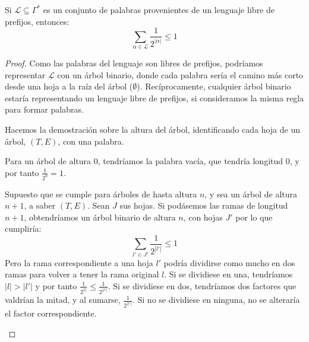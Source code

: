 \begin{lemma}
 Si $\mathcal{L}\subseteq \Gamma^{\ast}$ es un conjunto de palabras provenientes de un lenguaje libre de prefijos, entonces:
 \[
   \sum_{\alpha \in \mathcal{L}} \frac{1}{2^{|\alpha|}} \le 1
 \]
 \label{lemma:kraft}
\end{lemma}
  \begin{proof}
   Como las palabras del lenguaje son libres de prefijos, podríamos representar $\mathcal{L}$ con un árbol binario, donde
   cada palabra sería el camino más corto desde una hoja a la raíz del árbol ($\emptyset$). Recíprocamente, cualquier árbol binario estaría
   representando un lenguaje libre de prefijos, si consideramos la misma regla para formar palabras.
   
   Hacemos la demostración sobre la altura del árbol, identificando cada hoja de un árbol, $(T,E)$, con una palabra.
   
   \begin{subenv}
    Para un árbol de altura $0$, tendríamos la palabra vacía, que tendría longitud $0$, y por tanto $\frac{1}{2^0} = 1$.
    
    Supuesto que se cumple para árboles de hasta altura $n$, y sea un árbol de altura $n+1$, a saber $(T,E)$. Sean $J$ sus hojas.
    Si podásemos las ramas de longitud $n+1$, obtendríamos un árbol binario de altura $n$, con hojas $J'$ por lo que cumpliría:
    \[
      \sum_{l'\in J'} \frac{1}{2^{|l'|}} \le 1
    \]
    Pero la rama correspondiente a una hoja $l'$ podría dividirse como mucho en dos ramas para volver a tener la rama original $l$. Si 
    se dividiese en una, tendríamos $|l| > |l'|$ y por tanto $\frac{1}{2^{|l|}} \le \frac{1}{2^{|l'|}}$. Si se dividiese en dos, tendríamos
    dos factores que valdrían la mitad, y al sumarse, $\frac{1}{2^{|l'|}}$. Si no se dividiese en ninguna, no se alteraría
    el factor correspondiente.
   \end{subenv}
  \end{proof}

